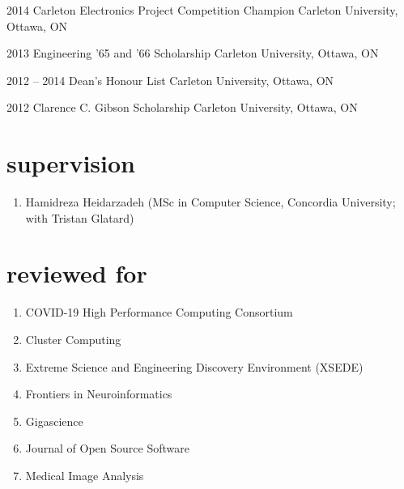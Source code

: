 \documentclass[]{friggeri-cv} %
\begin{document}
\begin{entrylist}
\entry
{2014}
{Carleton Electronics Project Competition Champion}
{Carleton University, Ottawa, ON}
{}
\vspace{-7pt}

\entry
{2013}
{Engineering '65 and '66 Scholarship}
{Carleton University, Ottawa, ON}
{}
\vspace{-7pt}

\entry
{2012 -- 2014}
{Dean's Honour List}
{Carleton University, Ottawa, ON}
{}
\vspace{-7pt}

\entry
{2012}
{Clarence C. Gibson Scholarship}
{Carleton University, Ottawa, ON}
{}
\vspace{-7pt}
\end{entrylist}

\section{supervision}
\begin{enumerate}
\item Hamidreza Heidarzadeh (MSc in Computer Science, Concordia University; with Tristan Glatard)
\end{enumerate}


\section{reviewed for}
\begin{enumerate}
\item COVID-19 High Performance Computing Consortium
\item Cluster Computing
\item Extreme Science and Engineering Discovery Environment (XSEDE)
\item Frontiers in Neuroinformatics
\item Gigascience
\item Journal of Open Source Software
\item Medical Image Analysis
\end{enumerate}
\end{document}
